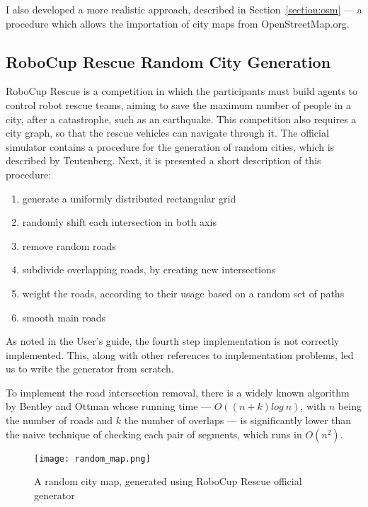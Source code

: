 I also developed a more realistic approach, described in
Section~\ref{section:osm}  --- a procedure which allows the importation of city
maps from OpenStreetMap.org.

\subsection{RoboCup Rescue Random City Generation}
\label{section:roborescue}

RoboCup Rescue is a competition in which the participants must build agents to
control robot rescue teams, aiming to save the maximum number of people in a
city, after a catastrophe, such as an earthquake. This competition also
requires a city graph, so that the rescue vehicles can navigate through it.
The official simulator contains a procedure for the generation of random
cities, which is described by Teutenberg\citep{Teutenberg03}. Next, it is
presented a short description of this procedure:

\begin{enumerate}
	\item generate a uniformly distributed rectangular grid
	\item randomly shift each intersection in both axis
	\item remove random roads
	\item subdivide overlapping roads, by creating new intersections
	\item weight the roads, according to their usage based on a random set of paths
	\item smooth main roads
\end{enumerate}

As noted in the User's guide, the fourth step implementation is not correctly
implemented. This, along with other references to implementation problems, led
us to write the generator from scratch.

To implement the road intersection removal, there is a widely known algorithm
by Bentley and Ottman\cite{bentley-ottman} whose running time --- $O((n + k)
log~n)$, with $n$ being the number of roads and $k$ the number of overlaps ---
is significantly lower than the naive technique of checking each pair of
segments, which runs in $O(n^2)$.

\begin{figure}[h]
\centering
\texttt{[image: random\_map.png]}
\caption{A random city map, generated using RoboCup Rescue official generator}
\label{fig:random_map}
\end{figure}

